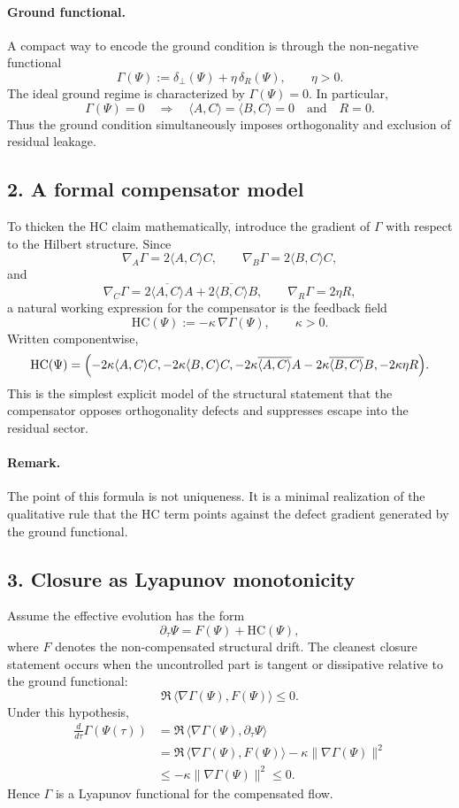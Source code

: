 \paragraph{Ground functional.}
A compact way to encode the ground condition is through the non-negative
functional
\[
\Gamma(\Psi) := \delta_{\perp}(\Psi) + \eta\,\delta_R(\Psi), \qquad \eta>0.
\]
The ideal ground regime is characterized by $\Gamma(\Psi)=0$. In particular,
\[
\Gamma(\Psi)=0 \quad \Longrightarrow \quad \langle A,C\rangle=\langle B,C\rangle=0
\quad\text{and}\quad R=0.
\]
Thus the ground condition simultaneously imposes orthogonality and exclusion of
residual leakage.

\subsection*{2. A formal compensator model}
To thicken the HC claim mathematically, introduce the gradient of $\Gamma$ with
respect to the Hilbert structure. Since
\[
\nabla_A \Gamma = 2\langle A,C\rangle C,
\qquad
\nabla_B \Gamma = 2\langle B,C\rangle C,
\]
and
\[
\nabla_C \Gamma = 2\overline{\langle A,C\rangle}A + 2\overline{\langle B,C\rangle}B,
\qquad
\nabla_R \Gamma = 2\eta R,
\]
a natural working expression for the compensator is the feedback field
\[
\mathrm{HC}(\Psi) := -\kappa\,\nabla \Gamma(\Psi), \qquad \kappa>0.
\]
Written componentwise,
\[
\mathrm{HC}(\Psi) =
\Bigl(
-2\kappa\langle A,C\rangle C,
-2\kappa\langle B,C\rangle C,
-2\kappa\overline{\langle A,C\rangle}A -2\kappa\overline{\langle B,C\rangle}B,
-2\kappa\eta R
\Bigr).
\]
This is the simplest explicit model of the structural statement that the
compensator opposes orthogonality defects and suppresses escape into the
residual sector.

\paragraph{Remark.}
The point of this formula is not uniqueness. It is a minimal realization of the
qualitative rule that the HC term points against the defect gradient generated
by the ground functional.

\subsection*{3. Closure as Lyapunov monotonicity}
Assume the effective evolution has the form
\[
\partial_\tau \Psi = F(\Psi) + \mathrm{HC}(\Psi),
\]
where $F$ denotes the non-compensated structural drift. The cleanest closure
statement occurs when the uncontrolled part is tangent or dissipative relative
to the ground functional:
\[
\Re\,\langle \nabla\Gamma(\Psi),F(\Psi)\rangle \le 0.
\tag{T}
\]
Under this hypothesis,
\begin{align*}
\frac{d}{d\tau}\Gamma(\Psi(\tau))
&= \Re\,\langle \nabla\Gamma(\Psi),\partial_\tau\Psi\rangle \\
&= \Re\,\langle \nabla\Gamma(\Psi),F(\Psi)\rangle
   - \kappa\|\nabla\Gamma(\Psi)\|^2 \\
&\le -\kappa\|\nabla\Gamma(\Psi)\|^2 \le 0.
\end{align*}
Hence $\Gamma$ is a Lyapunov functional for the compensated flow.

